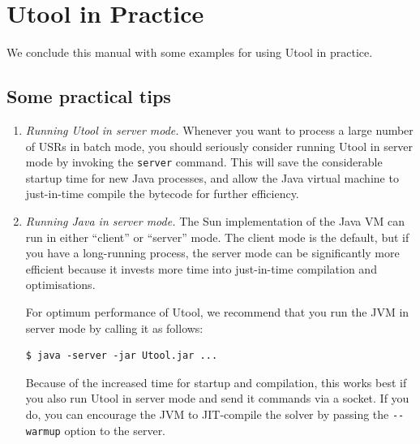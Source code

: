 
\section{Utool in Practice} \label{sec:practice}

We conclude this manual with some examples for using Utool in
practice.

\subsection{Some practical tips} \label{sec:practice-some-practical-tips}

\begin{enumerate}
\item \textit{Running Utool in server mode.} Whenever you want to
process a large number of USRs in batch mode, you should seriously
consider running Utool in server mode by invoking the \verb?server?
command. This will save the considerable startup time for new Java
processes, and allow the Java virtual machine to just-in-time compile
the bytecode for further efficiency.

\item \textit{Running Java in server mode.} The Sun implementation of
the Java VM can run in either ``client'' or ``server'' mode. The
client mode is the default, but if you have a long-running process,
the server mode can be significantly more efficient because it invests
more time into just-in-time compilation and optimisations.

For optimum performance of Utool, we recommend that you run the JVM in
server mode by calling it as follows:
\begin{verbatim}
$ java -server -jar Utool.jar ...
\end{verbatim}

Because of the increased time for startup and compilation, this works
best if you also run Utool in server mode and send it commands via a
socket. If you do, you can encourage the JVM to JIT-compile the solver by passing the \verb?--warmup? option to the server.




\end{enumerate}
